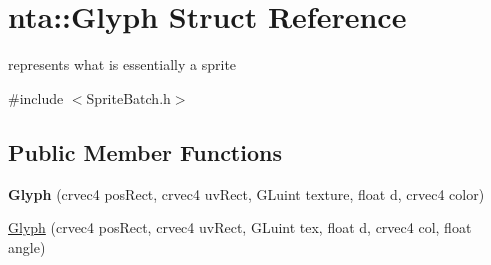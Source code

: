 \hypertarget{structnta_1_1Glyph}{}\section{nta\+:\+:Glyph Struct Reference}
\label{structnta_1_1Glyph}


represents what is essentially a sprite  




{\ttfamily \#include $<$Sprite\+Batch.\+h$>$}

\subsection*{Public Member Functions}
\begin{DoxyCompactItemize}
\item 
\mbox{\label{structnta_1_1Glyph_ae400ec6b413eee3d1f091ff9cc594bba}} 
{\bfseries Glyph} (crvec4 pos\+Rect, crvec4 uv\+Rect, G\+Luint texture, float d, crvec4 color)
\item 
\hyperlink{structnta_1_1Glyph_a3b2afa4370140736d9d1b28de20d2105}{Glyph} (crvec4 pos\+Rect, crvec4 uv\+Rect, G\+Luint tex, float d, crvec4 col, float angle)
\end{DoxyCompactItemize}
